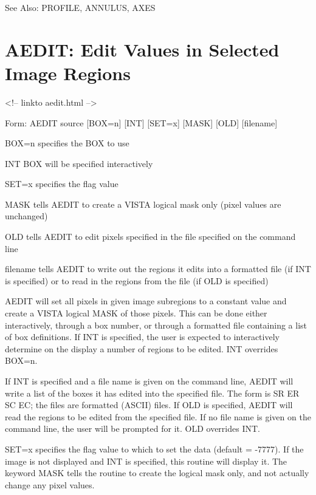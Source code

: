 See Also: PROFILE, ANNULUS, AXES

\section{AEDIT: Edit Values in Selected Image Regions}
\begin{rawhtml}
<!-- linkto aedit.html -->
\end{rawhtml}
\begin{command}
  \item[Form: AEDIT source {[BOX=n]} {[INT]} {[SET=x]} {[MASK]} {[OLD]} 
       {[filename]}\hfill]{}
  \item[BOX=n]{specifies the BOX to use}
  \item[INT]{BOX will be specified interactively}
  \item[SET=x]{specifies the flag value}
  \item[MASK]{tells AEDIT to create a VISTA logical mask only (pixel values
       are unchanged)}
  \item[OLD]{tells AEDIT to edit pixels specified in the file specified on
       the command line}
  \item[filename]{tells AEDIT to write out the regions it edits into a
       formatted file (if INT is specified) or to read in the regions from
       the file (if OLD is specified)}
\end{command}

AEDIT will set all pixels in given image subregions to a constant value and
create a VISTA logical MASK of those pixels.  This can be done either
interactively, through a box number, or through a formatted file containing
a list of box definitions.  If INT is specified, the user is expected to
interactively determine on the display a number of regions to be edited.
INT overrides BOX=n.  

If INT is specified and a file name is given on the command line, AEDIT
will write a list of the boxes it has edited into the specified file.  The
form is SR ER SC EC; the files are formatted (ASCII) files.  If OLD is
specified, AEDIT will read the regions to be edited from the specified
file.  If no file name is given on the command line, the user will be
prompted for it.  OLD overrides INT.

SET=x specifies the flag value to which to set the data (default = -7777).
If the image is not displayed and INT is specified, this routine will
display it.  The keyword MASK tells the routine to create the logical mask
only, and not actually change any pixel values.


